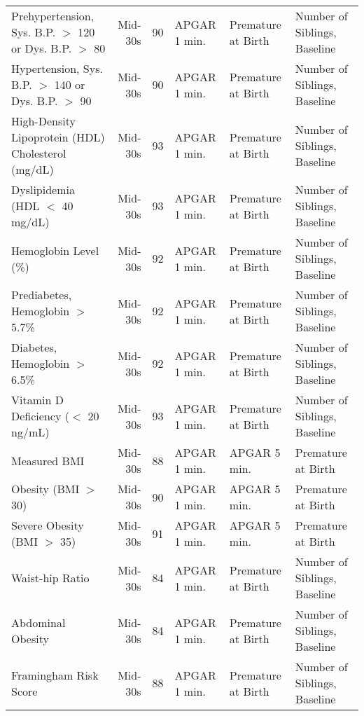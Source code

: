 \begin{tabular}{l r r l l l}
Prehypertension, Sys. B.P. $>$ 120 or Dys. B.P. $>$ 80	&	Mid-30s	&	90	&	APGAR 1 min. & Premature at Birth & Number of Siblings, Baseline	\\
Hypertension, Sys. B.P. $>$ 140 or Dys. B.P. $>$ 90	&	Mid-30s	&	90	&	APGAR 1 min. & Premature at Birth & Number of Siblings, Baseline	\\
High-Density Lipoprotein (HDL) Cholesterol (mg/dL)	&	Mid-30s	&	93	&	APGAR 1 min. & Premature at Birth & Number of Siblings, Baseline	\\
Dyslipidemia (HDL $<$ 40 mg/dL)	&	Mid-30s	&	93	&	APGAR 1 min. & Premature at Birth & Number of Siblings, Baseline	\\
Hemoglobin Level (\%)	&	Mid-30s	&	92	&	APGAR 1 min. & Premature at Birth & Number of Siblings, Baseline	\\
Prediabetes, Hemoglobin $>$ 5.7\%	&	Mid-30s	&	92	&	APGAR 1 min. & Premature at Birth & Number of Siblings, Baseline	\\
Diabetes, Hemoglobin $>$ 6.5\%	&	Mid-30s	&	92	&	APGAR 1 min. & Premature at Birth & Number of Siblings, Baseline	\\
Vitamin D Deficiency ($<$ 20 ng/mL)	&	Mid-30s	&	93	&	APGAR 1 min. & Premature at Birth & Number of Siblings, Baseline	\\

Measured BMI	&	Mid-30s	&	88	&	APGAR 1 min. & APGAR 5 min. & Premature at Birth \\
Obesity (BMI $>$ 30)	&	Mid-30s	&	90	&	APGAR 1 min. & APGAR 5 min. & Premature at Birth \\
Severe Obesity (BMI $>$ 35)	&	Mid-30s	&	91	&	APGAR 1 min. & APGAR 5 min. & Premature at Birth \\
Waist-hip Ratio	&	Mid-30s	&	84	& APGAR 1 min. & Premature at Birth & Number of Siblings, Baseline \\
Abdominal Obesity	&	Mid-30s	&	84	& APGAR 1 min. & Premature at Birth & Number of Siblings, Baseline \\
Framingham Risk Score	&	Mid-30s	&	88	& APGAR 1 min. & Premature at Birth & Number of Siblings, Baseline \\
\bottomrule											
\end{tabular}